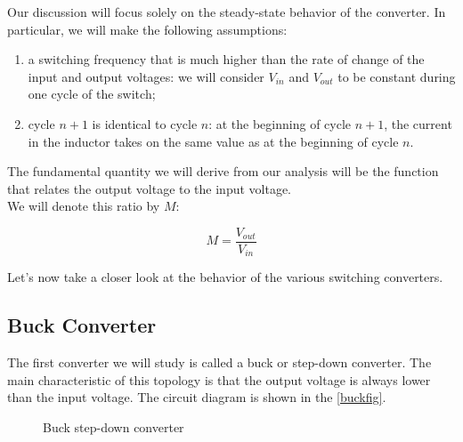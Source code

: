 \documentclass[../main.tex]{subfiles}
\begin{document}
Our discussion will focus solely on the steady-state behavior of the converter. In particular, we will make the following assumptions:

\begin{enumerate}[label=\textbf{-}]
	\item a switching frequency that is much higher than the rate of change of the input and output voltages: we will consider $V_{in}$ and $V_{out}$ to be constant during one cycle of the switch;
	\item cycle $n+1$ is identical to cycle $n$: at the beginning of cycle $n+1$, the current in the inductor takes on the same value as at the beginning of cycle $n$.
\end{enumerate}

The fundamental quantity we will derive from our analysis will be the function that relates the output voltage to the input voltage.\\ 

We will denote this ratio by $M$:

\begin{equation}
	M = \frac{V_{out}}{V_{in}}
\end{equation}

Let's now take a closer look at the behavior of the various switching converters.


\subsection{Buck Converter}

The first converter we will study is called a buck or step-down converter. The
main characteristic of this topology is that the output voltage is always lower than the input voltage. The circuit diagram is shown in the \autoref{buckfig}.


\begin{figure}[h]
\begin{center}


\caption{Buck step-down converter}	
\label{buckfig}
\end{center}
\end{figure}
\end{document}
